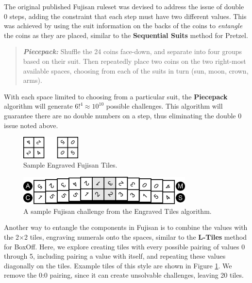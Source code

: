 \documentclass[journal]{IEEEtran}
\begin{document}
The original published Fujisan ruleset was devised to address the issue of double 0 steps, adding the constraint that each step must have two different values. This was achieved by using the suit information on the backs of the coins to \textit{entangle} the coins as they are placed, similar to the \textbf{Sequential Suits} method for Pretzel.

\begin{quote}
    
  {\it \bf Piecepack:} Shuffle the 24 coins face-down, and separate into four groups based on their suit. Then repeatedly place two coins on the two right-most available spaces, choosing from each of the suits in turn (sun, moon, crown, arms).
\end{quote}

With each space limited to choosing from a particular suit, the \textbf{Piecepack} algorithm will generate $6!^4 \approx 10^{10}$ possible challenges. This algorithm will guarantee there are no double numbers on a step, thus eliminating the double 0 issue noted above. 

\begin{figure}[t]
\centering
\includegraphics[width=3cm]{figure13.png}
\caption{Sample Engraved Fujisan Tiles.}
\label{fig:engravedsample}
\end{figure}


\begin{figure}[b]
\includegraphics[width=8.8cm]{figure14.png}
\caption{A sample Fujisan challenge from the Engraved Tiles algorithm.}
\label{fig:tileexample}
\end{figure}



Another way to entangle the components in Fujisan is to combine the values with the 2$\times$2 tiles, engraving numerals onto the spaces, similar to the \textbf{L-Tiles} method for BoxOff. Here, we explore creating tiles with every possible pairing of values 0 through 5, including pairing a value with itself, and repeating these values diagonally on the tiles. Example tiles of this style are shown in Figure \ref{fig:engravedsample}. We remove the 0:0 pairing, since it can create unsolvable challenges, leaving 20 tiles.
\end{document}
